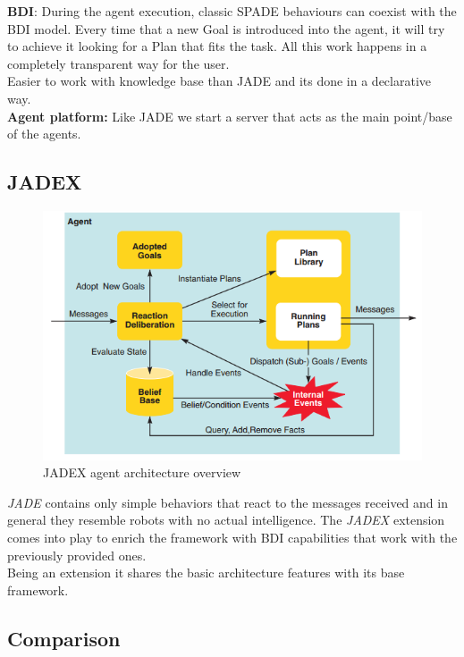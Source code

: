 \documentclass[a4paper, 11pt]{article}
\begin{document}
\noindent \textbf{BDI}: During the agent execution, classic SPADE behaviours can coexist with the BDI model. Every time that a new Goal is introduced into the agent, it will try to achieve it looking for a Plan that fits the task. All this work happens in a completely transparent way for the user. \\
Easier to work with knowledge base than JADE and its done in a declarative way. \\

\noindent \textbf{Agent platform:} Like JADE we start a server that acts as the main point/base of the agents.

\subsection{JADEX}

\begin{figure}[H]
	\caption{JADEX agent architecture overview}
	\centering
	\includegraphics[scale=0.7]{./images/jadex_overview.png}
\end{figure}

\textit{JADE} contains only simple behaviors that react to the messages received and in general they resemble robots with no actual intelligence. The \textit{JADEX} extension comes into play to enrich the framework with BDI capabilities that work with the previously provided ones. \\

Being an extension it shares the basic architecture features with its base framework. 

\subsection{Comparison}
\end{document}
